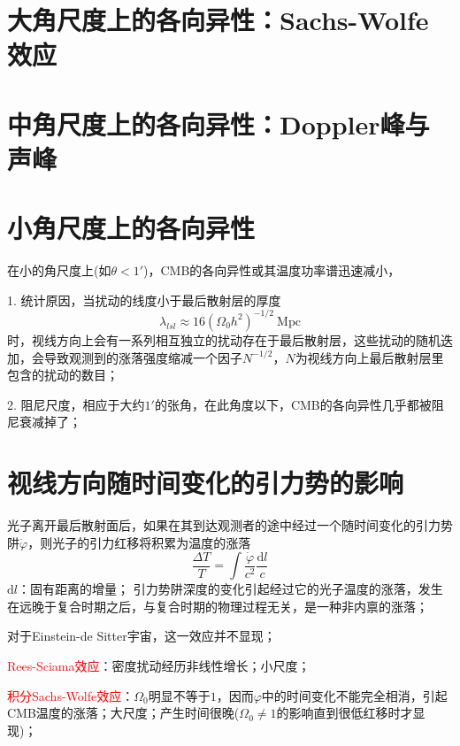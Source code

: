 \documentclass[12pt,a4paper]{article}
\newcommand{\dif}{\mathrm{d}}
\begin{document}
\section{大角尺度上的各向异性：Sachs-Wolfe效应}







\section{中角尺度上的各向异性：Doppler峰与声峰}




\section{小角尺度上的各向异性}
在小的角尺度上(如$\theta < 1'$)，CMB的各向异性或其温度功率谱迅速减小，

1. 统计原因，当扰动的线度小于最后散射层的厚度
\begin{equation}
\lambda_{lsl} \approx 16(\Omega_0 h^2)^{-1/2} ~\text{Mpc}
\end{equation}
时，视线方向上会有一系列相互独立的扰动存在于最后散射层，这些扰动的随机迭加，会导致观测到的涨落强度缩减一个因子$N^{-1/2}$，$N$为视线方向上最后散射层里包含的扰动的数目；

2. 阻尼尺度，相应于大约$1'$的张角，在此角度以下，CMB的各向异性几乎都被阻尼衰减掉了；


\section{视线方向随时间变化的引力势的影响}
光子离开最后散射面后，如果在其到达观测者的途中经过一个随时间变化的引力势阱$\dot{\varphi}$，则光子的引力红移将积累为温度的涨落
\begin{equation}
\frac{\Delta T}{T} = \int \frac{\dot{\varphi}}{c^2} \frac{\dif l}{c}
\end{equation}
${\dif l}$：固有距离的增量；
引力势阱深度的变化引起经过它的光子温度的涨落，发生在远晚于复合时期之后，与复合时期的物理过程无关，是一种非内禀的涨落；

对于Einstein-de Sitter宇宙，这一效应并不显现；

\textcolor{red}{Rees-Sciama效应}：密度扰动经历非线性增长；小尺度；

\textcolor{red}{积分Sachs-Wolfe效应}：$\Omega_0$明显不等于$1$，因而$\varphi$中的时间变化不能完全相消，引起CMB温度的涨落；大尺度；产生时间很晚($\Omega_0 \neq 1$的影响直到很低红移时才显现)；
\end{document}
